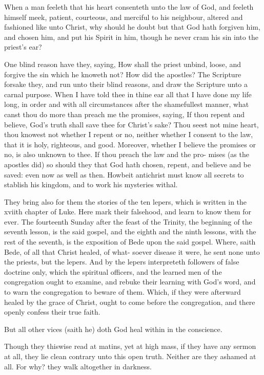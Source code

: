\documentclass{custom}
\begin{document}
When a man feeleth that his heart consenteth unto the 
law of God, and feeleth himself meek, patient, courteous, 
and merciful to his neighbour, altered and fashioned like 
unto Christ, why should he doubt but that God hath forgiven 
him, and chosen him, and put his Spirit in him, though 
he never cram his sin into the priest's ear? 

One blind reason have they, saying, How shall the 
priest unbind, loose, and forgive the sin which he knoweth 
not? How did the apostles? The Scripture forsake 
they, and run unto their blind reasons, and draw the 
Scripture unto a carnal purpose. When I have told thee 
in thine ear all that I have done my life long, in order and 
with all circumstances after the shamefullest manner, what 
canst thou do more than preach me the promises, saying, 
If thou repent and believe, God's truth shall save thee 
for Christ's sake? Thou seest not mine heart, thou 
knowest not whether I repent or no, neither whether I 
consent to the law, that it is holy, righteous, and good. 
Moreover, whether I believe the promises or no, is also 
unknown to thee. If thou preach the law and the pro- 
mises (as the apostles did) so should they that God hath 
chosen, repent, and believe and be saved: even now as 
well as then. Howbeit antichrist must know all secrets 
to stablish his kingdom, and to work his mysteries withal. 

They bring also for them the stories of the ten lepers, 
which is written in the xviith chapter of Luke. Here 
mark their falsehood, and learn to know them for ever. 
The fourteenth Sunday after the feast of the Trinity, the 
beginning of the seventh lesson, is the said gospel, and 
the eighth and the ninth lessons, with the rest of the 
seventh, is the exposition of Bede upon the said gospel. 
Where, saith Bede, of all that Christ healed, of what- 
soever disease it were, he sent none unto the priests, but 
the lepers. And by the lepers interpreteth followers of 
false doctrine only, which the spiritual officers, and the 
learned men of the congregation ought to examine, and 
rebuke their learning with God's word, and to warn the
congregation to beware of them. Which, if they were 
afterward healed by the grace of Christ, ought to come 
before the congregation, and there openly confess their 
true faith. 

But all other vices (saith he) doth God heal within in 
the conscience. 

Though they thiswise read at matins, yet at high mass, if 
they have any sermon at all, they lie clean contrary unto this 
open truth. Neither are they ashamed at all. For why? 
they walk altogether in darkness. 
\end{document}
